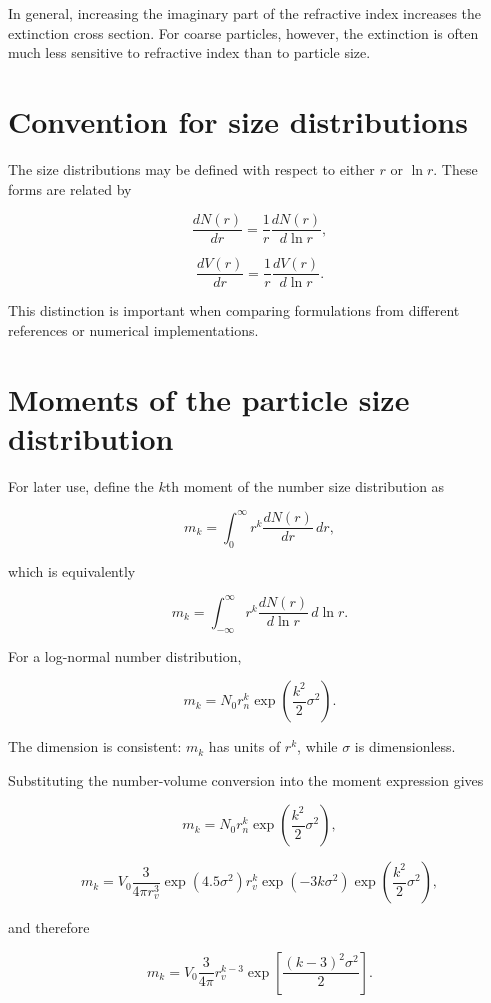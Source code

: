 \documentclass[
  letterpaper,
  open=any]{scrbook}
\begin{document}
In general, increasing the imaginary part of the refractive index
increases the extinction cross section. For coarse particles, however,
the extinction is often much less sensitive to refractive index than to
particle size.

\section{Convention for size
distributions}\label{convention-for-size-distributions}

The size distributions may be defined with respect to either \(r\) or
\(\ln r\). These forms are related by

\[
\frac{d N(r)}{d r}=\frac{1}{r}\frac{d N(r)}{d \ln r},
\]

\[
\frac{d V(r)}{d r}=\frac{1}{r}\frac{d V(r)}{d \ln r}.
\]

This distinction is important when comparing formulations from different
references or numerical implementations.

\section{Moments of the particle size
distribution}\label{moments-of-the-particle-size-distribution}

For later use, define the \(k\)th moment of the number size distribution
as

\[
m_k=\int_{0}^{\infty} r^k \frac{d N(r)}{d r} \, d r,
\]

which is equivalently

\[
m_k=\int_{-\infty}^{\infty} r^k \frac{d N(r)}{d \ln r} \, d \ln r.
\]

For a log-normal number distribution,

\[
m_k=N_0 r_n^k \exp\left(\frac{k^2}{2} \sigma^2\right).
\]

The dimension is consistent: \(m_k\) has units of \(r^k\), while
\(\sigma\) is dimensionless.

Substituting the number-volume conversion into the moment expression
gives

\[
m_k=N_0 r_n^k \exp\left(\frac{k^2}{2} \sigma^2\right),
\]

\[
m_k=V_{0} \frac{3}{4 \pi r_{v}^3}\exp(4.5 \sigma^2)r^k_{v} \exp(-3k \sigma^2) \exp\left(\frac{k^2}{2} \sigma^2\right),
\]

and therefore

\[
m_k=V_{0} \frac{3}{4 \pi} r^{k-3}_v\exp\left[\frac{(k-3)^2\sigma^2}{2} \right].
\]
\end{document}
